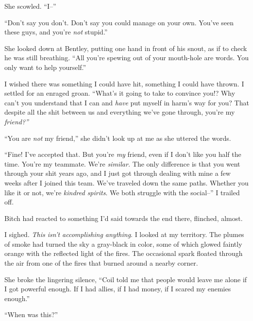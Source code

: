 She scowled.  ``I--''



``Don't say you don't.  Don't say you could manage on your own.  You've seen these guys, and you're \emph{not} stupid.''



She looked down at Bentley, putting one hand in front of his snout, as if to check he was still breathing.  ``All you're spewing out of your mouth-hole are words.  You only want to help yourself.''



I wished there was something I could have hit, something I could have thrown.  I settled for an enraged groan.  ``What's it going to take to convince you!?  Why can't you understand that I can and \emph{have} put myself in harm's way for you?  That despite all the shit between us and everything we've gone through, you're my \emph{friend?''}



``You are \emph{not} my friend,'' she didn't look up at me as she uttered the words.



``Fine!  I've accepted that.  But you're \emph{my}\emph{ }friend, even if I don't like you half the time.  You're my teammate.  We're \emph{similar.  }The only difference is that you went through your shit years ago, and I just got through dealing with mine a few weeks after I joined this team.  We've traveled down the same paths.  Whether you like it or not, we're \emph{kindred spirits}.  We both struggle with the social--''  I trailed off.



Bitch had reacted to something I'd said towards the end there, flinched, almost.



I sighed.  \emph{This isn't accomplishing anything}.  I looked at my territory.  The plumes of smoke had turned the sky a gray-black in color, some of which glowed faintly orange with the reflected light of the fires.  The occasional spark floated through the air from one of the fires that burned around a nearby corner.



She broke the lingering silence, ``Coil told me that people would leave me alone if I got powerful enough.  If I had allies, if I had money, if I scared my enemies enough.''



``When was this?''



